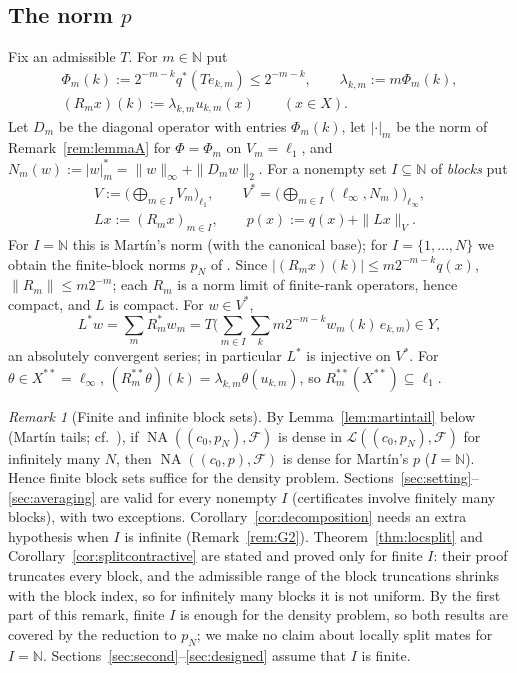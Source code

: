 \documentclass[10pt]{amsart}
\theoremstyle{definition}
\theoremstyle{remark}
\newtheorem{remark}[theorem]{Remark}
\newcommand{\NA}{\operatorname{NA}}
\newcommand{\N}{\mathbb N}
\begin{document}
\subsection{The norm $p$}
Fix an admissible $T$.  For $m\in\N$ put
\begin{gather*}
 \Phi_m(k):=2^{-m-k}q^*(Te_{k,m})\le 2^{-m-k},\qquad
 \lambda_{k,m}:=m\Phi_m(k),\\
 (R_mx)(k):=\lambda_{k,m}u_{k,m}(x)\qquad(x\in X).
\end{gather*}
Let $D_m$ be the diagonal operator with entries $\Phi_m(k)$, let
$|\cdot|_m$ be the norm of Remark~\ref{rem:lemmaA} for $\Phi=\Phi_m$ on
$V_m=\ell_1$, and $N_m(w):=|w|_m^*=\|w\|_\infty+\|D_mw\|_2$.  For a nonempty
set $I\subseteq\N$ of \emph{blocks} put
\begin{gather*}
 V:=\Big(\bigoplus_{m\in I}V_m\Big)_{\ell_1},\qquad
 V^*=\Big(\bigoplus_{m\in I}(\ell_\infty,N_m)\Big)_{\ell_\infty},\\
 Lx:=(R_mx)_{m\in I},\qquad p(x):=q(x)+\|Lx\|_V .
\end{gather*}
For $I=\N$ this is Mart\'in's norm (with the canonical base); for
$I=\{1,\dots,N\}$ we obtain the finite-block norms $p_N$ of \cite{PrB}.
Since $|(R_mx)(k)|\le m2^{-m-k}q(x)$, $\|R_m\|\leq m2^{-m}$; each $R_m$ is a
norm limit of finite-rank operators, hence compact, and $L$ is compact.
For $w\in V^*$,
\begin{equation}\label{eq:Lstar}
 L^*w=\sum_mR_m^*w_m=T\Big(\sum_{m\in I}\sum_k m2^{-m-k}w_m(k)\,e_{k,m}\Big)\in Y,
\end{equation}
an absolutely convergent series; in particular $L^*$ is injective on
$V^*$.  For $\theta\in X^{**}=\ell_\infty$,
$(R_m^{**}\theta)(k)=\lambda_{k,m}\theta(u_{k,m})$, so
$R_m^{**}(X^{**})\subseteq\ell_1$.

\begin{remark}[Finite and infinite block sets]\label{rem:blocks}
By Lemma~\ref{lem:martintail} below (Mart\'in tails; cf.\
\cite[Remark~6.9]{PrB}), if $\NA((c_0,p_N),\mathcal F)$ is dense in
$\mathcal L((c_0,p_N),\mathcal F)$ for infinitely many $N$, then
$\NA((c_0,p),\mathcal F)$ is dense for Mart\'in's $p$ ($I=\N$).  Hence
finite block sets suffice for the density problem.  Sections~\ref{sec:setting}--\ref{sec:averaging} are
valid for every nonempty $I$ (certificates involve finitely many blocks),
with two exceptions.  Corollary~\ref{cor:decomposition} needs an extra
hypothesis when $I$ is infinite (Remark~\ref{rem:G2}).
Theorem~\ref{thm:locsplit} and Corollary~\ref{cor:splitcontractive} are
stated and proved only for finite $I$: their proof truncates every block,
and the admissible range of the block truncations shrinks with the block
index, so for infinitely many blocks it is not uniform.  By the first
part of this remark, finite $I$ is enough for the density problem, so
both results are covered by the reduction to $p_N$; we make no claim about
locally split mates for $I=\N$.  Sections~\ref{sec:second}--\ref{sec:designed} assume that $I$ is finite.
\end{remark}
\end{document}

